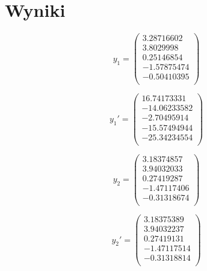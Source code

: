 \documentclass[11pt]{extarticle}
\begin{document}
	\pagebreak

	\section{Wyniki}

	\begin{multicols}{2}
		\begin{equation}
			y_1 = \begin{pmatrix}
				3.28716602 \\
				3.8029998 \\
				0.25146854 \\
				-1.57875474 \\
				-0.50410395 \\
			\end{pmatrix}
		\end{equation}

		\begin{equation}
			y_1' = \begin{pmatrix}
				16.74173331 \\
				-14.06233582 \\
				-2.70495914 \\
				-15.57494944 \\
				-25.34234554 \\
			\end{pmatrix}
		\end{equation}
	\end{multicols}

	\begin{multicols}{2}
		\begin{equation}
			y_2 = \begin{pmatrix}
				3.18374857 \\
				3.94032033 \\
				0.27419287 \\
				-1.47117406 \\
				-0.31318674 \\
			\end{pmatrix}
		\end{equation}

		\begin{equation}
			y_2' = \begin{pmatrix}
				3.18375389 \\
				3.94032237 \\
				0.27419131 \\
				-1.47117514 \\
				-0.31318814 \\
			\end{pmatrix}
		\end{equation}
	\end{multicols}
\end{document}
